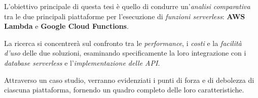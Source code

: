 L’obiettivo principale di questa tesi è quello di condurre un’\textit{analisi comparativa} tra le due principali piattaforme per l'esecuzione di \textit{funzioni serverless}: \textbf{AWS Lambda} e \textbf{Google Cloud Functions}. 

La ricerca si concentrerà sul confronto tra le \textit{performance}, i \textit{costi} e la \textit{facilità d’uso} delle due soluzioni, esaminando specificamente la loro integrazione con i \textit{database serverless} e l’\textit{implementazione delle API}. 

Attraverso un caso studio, verranno evidenziati i punti di forza e di debolezza di ciascuna piattaforma, fornendo un quadro completo delle loro caratteristiche.
